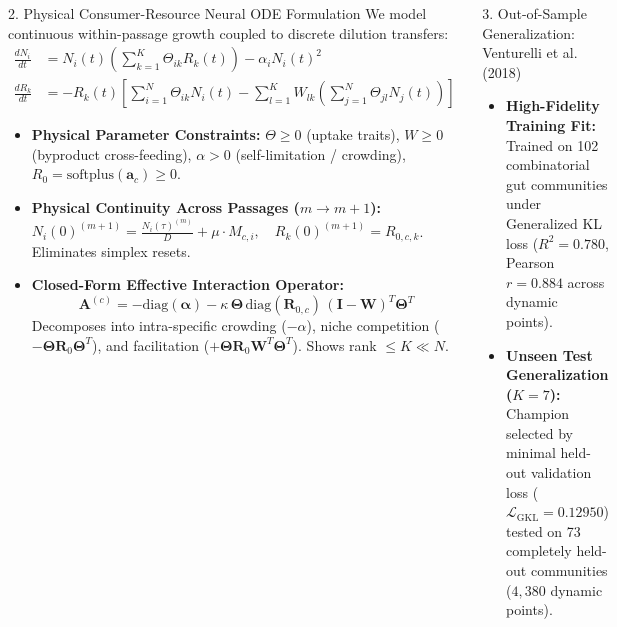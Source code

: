 \documentclass[final]{beamer}
\newlength{\colwidth}
\begin{document}
\begin{frame}[t]
\begin{columns}[t]
\begin{minipage}{\colwidth}
  \begin{block}{2. Physical Consumer-Resource Neural ODE Formulation}
    We model continuous within-passage growth coupled to discrete dilution transfers:
    \begin{align*}
      \frac{dN_i}{dt} &= N_i(t) \left( \sum_{k=1}^K \Theta_{ik} R_k(t) \right) - \alpha_i N_i(t)^2 \\
      \frac{dR_k}{dt} &= - R_k(t) \left[ \sum_{i=1}^N \Theta_{ik} N_i(t) - \sum_{l=1}^K W_{lk} \left( \sum_{j=1}^N \Theta_{jl} N_j(t) \right) \right]
    \end{align*}
    \begin{itemize}
      \item \textbf{Physical Parameter Constraints:} $\Theta \ge 0$ (uptake traits), $W \ge 0$ (byproduct cross-feeding), $\alpha > 0$ (self-limitation / crowding), $R_0 = \text{softplus}(\mathbf{a}_c) \ge 0$.
      \item \textbf{Physical Continuity Across Passages ($m \to m+1$):}
        $N_i(0)^{(m+1)} = \frac{N_i(\tau)^{(m)}}{D} + \mu \cdot M_{c, i}, \quad R_k(0)^{(m+1)} = R_{0, c, k}$. Eliminates simplex resets.
      \item \textbf{Closed-Form Effective Interaction Operator:}
        \begin{equation*}
          \mathbf{A}^{(c)} = -\text{diag}(\mathbf{\alpha}) - \kappa \, \mathbf{\Theta} \, \text{diag}(\mathbf{R}_{0, c}) \, (\mathbf{I} - \mathbf{W})^T \mathbf{\Theta}^T
        \end{equation*}
        Decomposes into intra-specific crowding ($-\alpha$), niche competition ($-\mathbf{\Theta}\mathbf{R}_0\mathbf{\Theta}^T$), and facilitation ($+\mathbf{\Theta}\mathbf{R}_0\mathbf{W}^T\mathbf{\Theta}^T$). Shows rank $\le K \ll N$.
    \end{itemize}
  \end{block}

  \begin{block}{3. Out-of-Sample Generalization: Venturelli et al. (2018)}
    \begin{itemize}
      \item \textbf{High-Fidelity Training Fit:} Trained on 102 combinatorial gut communities under Generalized KL loss ($R^2 = \mathbf{0.780}$, Pearson $r = \mathbf{0.884}$ across dynamic points).
      \item \textbf{Unseen Test Generalization ($K=7$):} Champion selected by minimal held-out validation loss ($\mathcal{L}_{\text{GKL}} = \mathbf{0.12950}$) tested on 73 completely held-out communities ($4{,}380$ dynamic points).
    \end{itemize}


\end{block}
\end{minipage}
\end{columns}
\end{frame}
\end{document}
